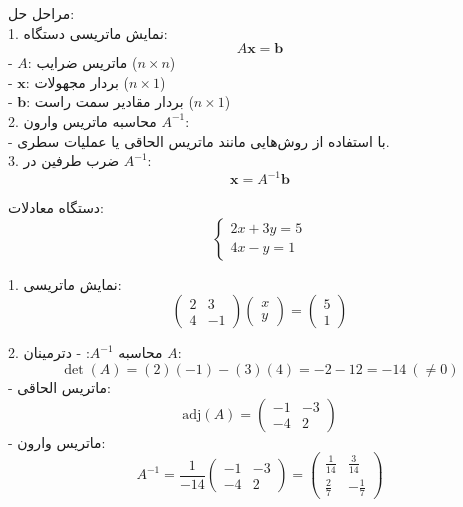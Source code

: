  مراحل حل:\\
1. نمایش ماتریسی دستگاه:\\
\[
A\mathbf{x} = \mathbf{b}
\]
- \( A \): ماتریس ضرایب (\( n \times n \))\\
- \( \mathbf{x} \): بردار مجهولات (\( n \times 1 \))\\
- \( \mathbf{b} \): بردار مقادیر سمت راست (\( n \times 1 \))\\

2. محاسبه ماتریس وارون \( A^{-1} \):\\
- با استفاده از روش‌هایی مانند ماتریس الحاقی یا عملیات سطری.
\\
3. ضرب طرفین در \( A^{-1} \):\\
\[
\mathbf{x} = A^{-1}\mathbf{b}
\]

\begin{example}[]
	دستگاه معادلات:
	\[
	\begin{cases}
		2x + 3y = 5 \\
		4x - y = 1
	\end{cases}
	\]
	
	1. نمایش ماتریسی:
	\[
	\begin{pmatrix}
		2 & 3 \\
		4 & -1
	\end{pmatrix}
	\begin{pmatrix}
		x \\
		y
	\end{pmatrix}
	=
	\begin{pmatrix}
		5 \\
		1
	\end{pmatrix}
	\]
	
	2. محاسبه \( A^{-1} \):
	- دترمینان \( A \):
	\[
	\det(A) = (2)(-1) - (3)(4) = -2 - 12 = -14 \ (\neq 0)
	\]
	- ماتریس الحاقی:
	\[
	\text{adj}(A) = \begin{pmatrix}
		-1 & -3 \\
		-4 & 2
	\end{pmatrix}
	\]
	- ماتریس وارون:
	\[
	A^{-1} = \frac{1}{-14} \begin{pmatrix}
		-1 & -3 \\
		-4 & 2
	\end{pmatrix}
	= \begin{pmatrix}
		\frac{1}{14} & \frac{3}{14} \\
		\frac{2}{7} & -\frac{1}{7}
	\end{pmatrix}
	\]
	

\end{example}
